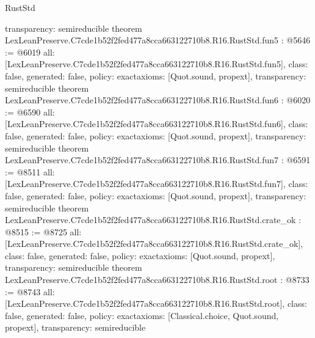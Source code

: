 \begin{lexlean}{RustStd}
\begin{coremodule}
{  transparency: semireducible
}
theorem LexLeanPreserve.C7cde1b52f2fed477a8cca663122710b8.R16.RustStd.fun5 : @5646 := @6019 {
  all: [LexLeanPreserve.C7cde1b52f2fed477a8cca663122710b8.R16.RustStd.fun5],
  class: false,
  generated: false,
  policy: exact{axioms: [Quot.sound, propext]},
  transparency: semireducible
}
theorem LexLeanPreserve.C7cde1b52f2fed477a8cca663122710b8.R16.RustStd.fun6 : @6020 := @6590 {
  all: [LexLeanPreserve.C7cde1b52f2fed477a8cca663122710b8.R16.RustStd.fun6],
  class: false,
  generated: false,
  policy: exact{axioms: [Quot.sound, propext]},
  transparency: semireducible
}
theorem LexLeanPreserve.C7cde1b52f2fed477a8cca663122710b8.R16.RustStd.fun7 : @6591 := @8511 {
  all: [LexLeanPreserve.C7cde1b52f2fed477a8cca663122710b8.R16.RustStd.fun7],
  class: false,
  generated: false,
  policy: exact{axioms: [Quot.sound, propext]},
  transparency: semireducible
}
theorem LexLeanPreserve.C7cde1b52f2fed477a8cca663122710b8.R16.RustStd.crate_ok : @8515 := @8725 {
  all: [LexLeanPreserve.C7cde1b52f2fed477a8cca663122710b8.R16.RustStd.crate_ok],
  class: false,
  generated: false,
  policy: exact{axioms: [Quot.sound, propext]},
  transparency: semireducible
}
theorem LexLeanPreserve.C7cde1b52f2fed477a8cca663122710b8.R16.RustStd.root : @8733 := @8743 {
  all: [LexLeanPreserve.C7cde1b52f2fed477a8cca663122710b8.R16.RustStd.root],
  class: false,
  generated: false,
  policy: exact{axioms: [Classical.choice, Quot.sound, propext]},
  transparency: semireducible
}


\end{coremodule}
\end{lexlean}

